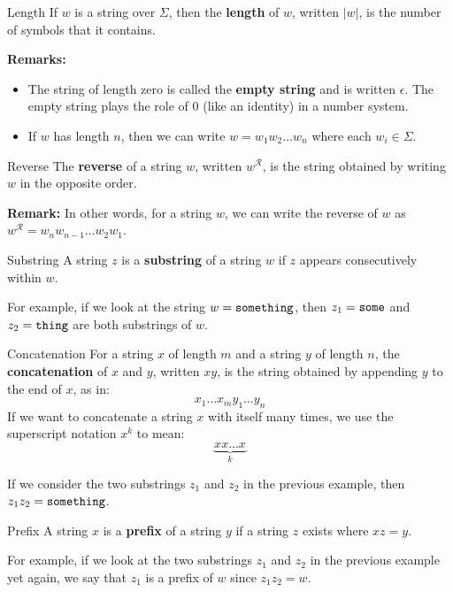 \documentclass[letterpaper]{article}
\begin{document}
\begin{definition}{Length}{}
    If $w$ is a string over $\Sigma$, then the \textbf{length} of $w$, written $|w|$, is the number of symbols that it contains. 
\end{definition}
\textbf{Remarks:}
\begin{itemize}
    \item The string of length zero is called the \textbf{empty string} and is written $\epsilon$. The empty string plays the role of 0 (like an identity) in a number system.
    \item If $w$ has length $n$, then we can write $w = w_1 w_2 \dots w_n$ where each $w_i \in \Sigma$.
\end{itemize} 

\begin{definition}{Reverse}{}
    The \textbf{reverse} of a string $w$, written $w^{\mathcal{R}}$, is the string obtained by writing $w$ in the opposite order.
\end{definition}
\textbf{Remark:} In other words, for a string $w$, we can write the reverse of $w$ as $w^{\mathcal{R}} = w_n w_{n - 1} \dots w_{2} w_{1}$. 

\begin{definition}{Substring}{}
    A string $z$ is a \textbf{substring} of a string $w$ if $z$ appears consecutively within $w$.
\end{definition}
For example, if we look at the string $w = \texttt{something}$, then $z_1 = \texttt{some}$ and $z_2 = \texttt{thing}$ are both substrings of $w$. 

\begin{definition}{Concatenation}{}
    For a string $x$ of length $m$ and a string $y$ of length $n$, the \textbf{concatenation} of $x$ and $y$, written $xy$, is the string obtained by appending $y$ to the end of $x$, as in: 
    \[x_1 \dots x_m y_1 \dots y_n\]
    If we want to concatenate a string $x$ with itself many times, we use the superscript notation $x^k$ to mean: 
    \[\underbrace{xx \dots x}_{k}\]
\end{definition}
If we consider the two substrings $z_1$ and $z_2$ in the previous example, then $z_1 z_2 = \texttt{something}$. 


\begin{definition}{Prefix}{}
    A string $x$ is a \textbf{prefix} of a string $y$ if a string $z$ exists where $xz = y$.
\end{definition}
For example, if we look at the two substrings $z_1$ and $z_2$ in the previous example yet again, we say that $z_1$ is a prefix of $w$ since $z_1 z_2 = w$. 
\end{document}
